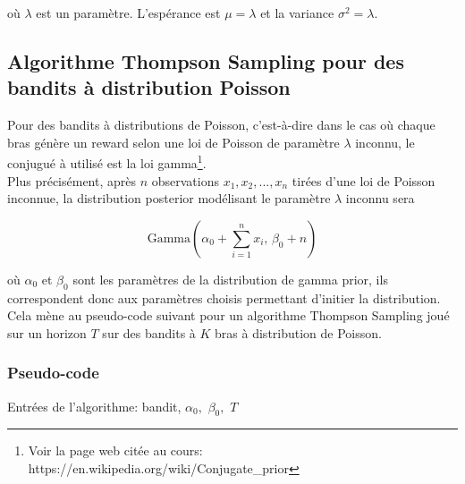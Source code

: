 \documentclass[letterpaper,11pt]{article}
\begin{document}
où $\lambda$ est un paramètre. L'espérance est $\mu=\lambda$ et la variance $\sigma^2=\lambda.$

\subsection{Algorithme Thompson Sampling pour des bandits à distribution Poisson }

Pour des bandits à distributions de Poisson, c'est-à-dire dans le cas où chaque bras génère un reward selon une loi de Poisson de paramètre $\lambda$ inconnu, le conjugué à utilisé est la loi gamma\footnote{Voir la page web citée au cours: https://en.wikipedia.org/wiki/Conjugate\_prior}.\\

Plus précisément, après $n$ observations $x_1,x_2,...,x_n$ tirées d'une loi de Poisson inconnue, la distribution posterior modélisant le paramètre $\lambda$ inconnu sera

\begin{equation}
\mathrm{Gamma}\left(\alpha_0 + \sum_{i=1}^n x_i,\,\beta_0 + n\right)
\end{equation}

où $\alpha_0$ et $\beta_0$ sont les paramètres de la distribution de gamma prior, ils correspondent donc aux paramètres choisis permettant d'initier la distribution.\\

Cela mène au pseudo-code suivant pour un algorithme Thompson Sampling joué sur un horizon $T$ sur des bandits à $K$ bras à distribution de Poisson.

\subsubsection{Pseudo-code}

Entrées de l'algorithme: bandit, $\alpha_0,$ $\beta_0,$ $T$\\
\end{document}
